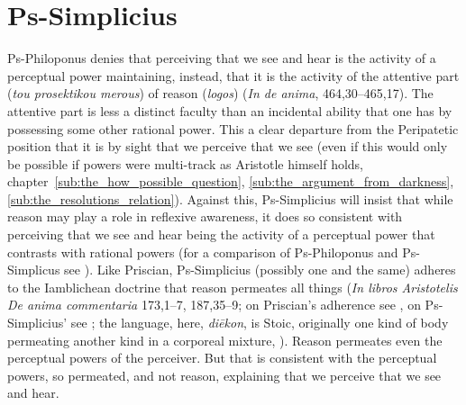 
\section{Ps-Simplicius} %
\label{sec:ps_simplicius}

Ps-Philoponus denies that perceiving that we see and hear is the activity of a perceptual power maintaining, instead, that it is the activity of the attentive part (\emph{tou prosektikou merous}) of reason (\emph{logos}) (\emph{In de anima}, 464,30–465,17). The attentive part is less a distinct faculty than an incidental ability that one has by possessing some other rational power. This a clear departure from the Peripatetic position that it is by sight that we perceive that we see (even if this would only be possible if powers were multi-track as Aristotle himself holds, chapter~\ref{sub:the_how_possible_question}, \ref{sub:the_argument_from_darkness}, \ref{sub:the_resolutions_relation}). Against this, Ps-Simplicius will insist that while reason may play a role in reflexive awareness, it does so consistent with perceiving that we see and hear being the activity of a perceptual power that contrasts with rational powers (for a comparison of Ps-Philoponus and Ps-Simplicus see \citealt{Lautner:2008id}). Like Priscian, Ps-Simplicius (possibly one and the same) adheres to the Iamblichean doctrine that reason permeates all things (\emph{In libros Aristotelis De anima commentaria} 173,1–7, 187,35–9; on Priscian's adherence see \citealt[448]{Kalderon:2017rw}, on Ps-Simplicius' see \citealt[332]{Lautner:2014cz}; the language, here, \emph{diēkon}, is Stoic, originally one kind of body permeating another kind in a corporeal mixture, \citealt[125]{Blumenthal:2000rf}). Reason permeates even the perceptual powers of the perceiver. But that is consistent with the perceptual powers, so permeated, and not reason, explaining that we perceive that we see and hear.

